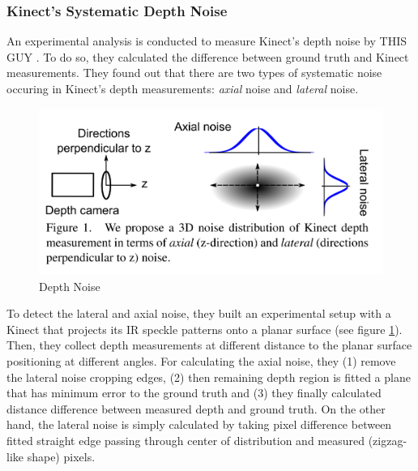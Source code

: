 \documentclass[a4paper]{report}
\numberwithin{figure}{section}
\begin{document}
\subsubsection{Kinect's Systematic Depth Noise}

An experimental analysis is conducted to measure Kinect's depth noise by 
THIS GUY \cite{}. To do so, 
they calculated the difference between ground truth and Kinect measurements. 
They found out that there are two types of systematic noise occuring in Kinect's depth 
measurements: \textit{axial} noise and \textit{lateral} noise.


\begin{figure}[H]
	\centering
  \includegraphics[width=0.7\linewidth,natwidth=640,natheight=640]
  {fig/ref_imgs/kinect_noise_model.png}
  \caption{Depth Noise}
	\label{fig:kinect_noise_model}
\end{figure}

To detect the lateral and axial noise, they built an experimental setup with a 
Kinect that projects its IR speckle patterns onto a planar surface 
(see figure \ref{fig:kinect_noise_model}). Then, they collect 
depth measurements at different distance to the planar surface 
positioning at different angles. 
For calculating the axial noise, they (1) remove the lateral noise cropping 
edges, (2) then remaining depth region is fitted a plane that has minimum 
error to the ground truth and (3) they finally calculated 
distance difference between measured depth and ground truth.
On the other hand, 
the lateral noise is simply calculated by taking pixel difference between 
fitted straight edge passing through center of distribution and 
measured (zigzag-like shape) pixels.
\end{document}

